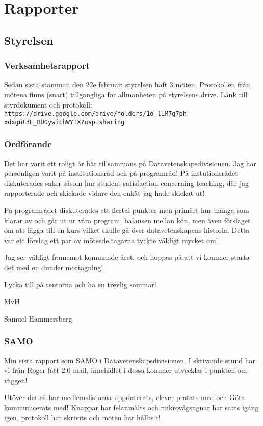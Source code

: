 \documentclass[protokoll]{dvd}
\begin{document}
\newpage

\section{Rapporter}
\subsection{Styrelsen}
\subsubsection*{Verksamhetsrapport}
Sedan sista stämman den 22e februari styrelsen haft 3 möten.
Protokollen från mötena finns (snart) tillgängliga för allmänheten på styrelsens drive.
Länk till styrdokument och protokoll:\\
\verb|https://drive.google.com/drive/folders/1o_lLM7g7ph-xdxgut3E_BU0ywichWYTX?usp=sharing|

\subsubsection*{Ordförande}
Det har varit ett roligt år här tillsammans på Datavetenskapsdivisionen.
Jag har personligen varit på institutionsråd och på programråd!
På instutionsrådet diskuterades saker såsom hur student satisfaction concerning
teaching, där jag rapporterade och skickade vidare den enkät jag hade skickat ut!

På programrådet diskuterades ett flertal punkter men primärt hur många som klarar
av och går ut ur våra program, balansen mellan kön, men även förslaget om att
lägga till en kurs vilket skulle gå över datavetenskapens historia. Detta var
ett förslag ett par av mötesdeltagarna tyckte väldigt mycket om!

Jag ser väldigt framemot kommande året, och hoppas på att vi kommer
starta det med en dunder mottagning!

Lycka till på tentorna och ha en trevlig sommar!

MvH

Samuel Hammersberg

\subsubsection*{SAMO}
Min sista rapport som SAMO i Datavetenskapsdivisionen.
I skrivande stund har vi från Roger fått 2.0 mail, innehållet i dessa
kommer utvecklas i punkten om väggen!

Utöver det så har medlemslistorna uppdaterats, elever pratats
med och Göta kommunicerats med! Knappar har felanmälts och mikrovågsugnar
har satts igång igen, protokoll har skrivits och möten har hållts i!
\end{document}
